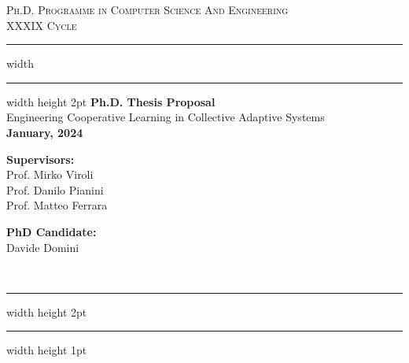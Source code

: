 \documentclass[12pt]{article}
\begin{document}
\begin{titlepage}

	\newcommand{\HRule}{\rule{\linewidth}{0.5mm}}
	\center
	
	\textsc{\Large Ph.D. Programme in Computer Science And Engineering}\\[0.5cm]
	
	\textsc{\Large XXXIX Cycle}\\[0.6cm]
	
	\hrule width \hsize \kern 1mm \hrule width \hsize height 2pt 
	\vspace{0.8cm}
	{ \large \bfseries Ph.D. Thesis Proposal}\\[0.6cm]
	{ \large Engineering Cooperative Learning in Collective Adaptive Systems}\\[0.6cm]
	
	
	
	\bfseries{January, 2024}


    \vspace{1.5cm}
    
    \noindent
    \begin{minipage}[t]{0.45\textwidth}
        \raggedright
        \textbf{Supervisors:}\\[0.5cm]
        Prof. Mirko Viroli\\
        Prof. Danilo Pianini\\
        Prof. Matteo Ferrara
    \end{minipage}%
    \hfill
    \begin{minipage}[t]{0.45\textwidth}
        \raggedleft
        \textbf{PhD Candidate:}\\[0.5cm]
        Davide Domini
    \end{minipage} \\[0.6cm]
	

	\hrule width \hsize height 2pt \kern 1mm \hrule width \hsize height 1pt
	\vspace{0.4cm}
	
\end{titlepage}
\end{document}
